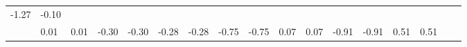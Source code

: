 \documentclass[
]{book}
\begin{document}
\begin{longtable}[]{@{}lllllllllllllllll@{}}
\begin{minipage}[t]{0.04\columnwidth}
-1.27\strut
\end{minipage} & \begin{minipage}[t]{0.03\columnwidth}\raggedright
-0.10\strut
\end{minipage}\tabularnewline
\begin{minipage}[t]{0.03\columnwidth}\raggedright
\strut
\end{minipage} & \begin{minipage}[t]{0.04\columnwidth}\raggedright
0.01\strut
\end{minipage} & \begin{minipage}[t]{0.03\columnwidth}\raggedright
0.01\strut
\end{minipage} & \begin{minipage}[t]{0.04\columnwidth}\raggedright
-0.30\strut
\end{minipage} & \begin{minipage}[t]{0.03\columnwidth}\raggedright
-0.30\strut
\end{minipage} & \begin{minipage}[t]{0.05\columnwidth}\raggedright
-0.28\strut
\end{minipage} & \begin{minipage}[t]{0.03\columnwidth}\raggedright
-0.28\strut
\end{minipage} & \begin{minipage}[t]{0.03\columnwidth}\raggedright
-0.75\strut
\end{minipage} & \begin{minipage}[t]{0.03\columnwidth}\raggedright
-0.75\strut
\end{minipage} & \begin{minipage}[t]{0.05\columnwidth}\raggedright
0.07\strut
\end{minipage} & \begin{minipage}[t]{0.03\columnwidth}\raggedright
0.07\strut
\end{minipage} & \begin{minipage}[t]{0.03\columnwidth}\raggedright
-0.91\strut
\end{minipage} & \begin{minipage}[t]{0.03\columnwidth}\raggedright
-0.91\strut
\end{minipage} & \begin{minipage}[t]{0.04\columnwidth}\raggedright
0.51\strut
\end{minipage} & \begin{minipage}[t]{0.03\columnwidth}\raggedright
0.51\strut
\end{minipage} & \begin{minipage}[t]{0.04\columnwidth}\raggedright

\end{minipage}
\end{longtable}
\end{document}
